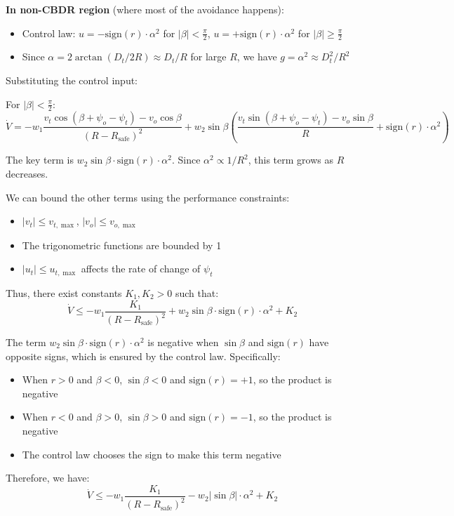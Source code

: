 \documentclass[11pt,a4paper]{article}
\numberwithin{equation}{section}
\begin{document}
\textbf{In non-CBDR region} (where most of the avoidance happens):
\begin{itemize}
\item Control law: $u = -\text{sign}(r) \cdot \alpha^2$ for $|\beta| < \frac{\pi}{2}$, $u = +\text{sign}(r) \cdot \alpha^2$ for $|\beta| \geq \frac{\pi}{2}$
\item Since $\alpha = 2\arctan(D_t/2R) \approx D_t/R$ for large $R$, we have $g = \alpha^2 \approx D_t^2/R^2$
\end{itemize}

Substituting the control input:

For $|\beta| < \frac{\pi}{2}$:
\[
\dot{V} = -w_1 \frac{v_t\cos(\beta + \psi_o - \psi_t) - v_o\cos\beta}{(R-R_{\text{safe}})^2} + w_2 \sin\beta \left( \frac{v_t\sin(\beta + \psi_o - \psi_t) - v_o\sin\beta}{R} + \text{sign}(r) \cdot \alpha^2 \right)
\]

The key term is $w_2 \sin\beta \cdot \text{sign}(r) \cdot \alpha^2$. Since $\alpha^2 \propto 1/R^2$, this term grows as $R$ decreases.

We can bound the other terms using the performance constraints:
\begin{itemize}
\item $|v_t| \leq v_{t,\max}$, $|v_o| \leq v_{o,\max}$
\item The trigonometric functions are bounded by 1
\item $|u_t| \leq u_{t,\max}$ affects the rate of change of $\psi_t$
\end{itemize}

Thus, there exist constants $K_1, K_2 > 0$ such that:
\[
\dot{V} \leq -w_1 \frac{K_1}{(R-R_{\text{safe}})^2} + w_2 \sin\beta \cdot \text{sign}(r) \cdot \alpha^2 + K_2
\]

The term $w_2 \sin\beta \cdot \text{sign}(r) \cdot \alpha^2$ is negative when $\sin\beta$ and $\text{sign}(r)$ have opposite signs, which is ensured by the control law. Specifically:
\begin{itemize}
\item When $r > 0$ and $\beta < 0$, $\sin\beta < 0$ and $\text{sign}(r) = +1$, so the product is negative
\item When $r < 0$ and $\beta > 0$, $\sin\beta > 0$ and $\text{sign}(r) = -1$, so the product is negative
\item The control law chooses the sign to make this term negative
\end{itemize}

Therefore, we have:
\[
\dot{V} \leq -w_1 \frac{K_1}{(R-R_{\text{safe}})^2} - w_2 |\sin\beta| \cdot \alpha^2 + K_2
\]
\end{document}
